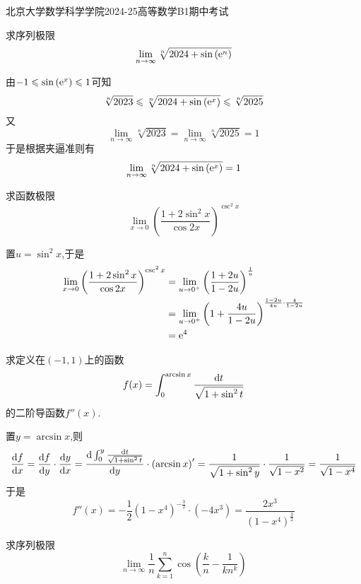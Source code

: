 \documentclass{ctexart}
\begin{document}
\pagestyle{empty}
\begin{center}\Large
    北京大学数学科学学院2024-25高等数学B1期中考试
\end{center}
\begin{problem}[1.(10\songti{分})]
    求序列极限$$\lim_{n\to\infty}{\sqrt[n]{2024+\sin\left(\mathrm{e}^n\right)}}$$
\end{problem}
\begin{solution}[Solution.]
    由$-1\leqslant\sin\left(\mathrm{e}^x\right)\leqslant 1$可知
    $$\sqrt[n]{2023}\leqslant\sqrt[n]{2024+\sin\left(\mathrm{e}^x\right)}\leqslant\sqrt[n]{2025}$$
    又$$\lim_{n\to\infty}\sqrt[n]{2023}=\lim_{n\to\infty}\sqrt[n]{2025}=1$$
    于是根据夹逼准则有$$\lim_{n\to\infty}\sqrt[n]{2024+\sin\left(\mathrm{e}^x\right)}=1$$
\end{solution}
\begin{problem}[2.(10\songti{分})]
    求函数极限$$\lim_{x\to0}\left(\dfrac{1+2\sin^2x}{\cos2x}\right)^{\csc^2x}$$
\end{problem}
\begin{solution}[Solution.]
    置$u=\sin^2 x$,于是
    $$\begin{aligned}
        \lim_{x\to0}\left(\dfrac{1+2\sin^2x}{\cos2x}\right)^{\csc^2x}
        &= \lim_{u\to0^+}\left(\dfrac{1+2u}{1-2u}\right)^{\frac{1}{u}} \\
        &= \lim_{u\to0^+}\left(1+\dfrac{4u}{1-2u}\right)^{\frac{1-2u}{4u}\cdot\frac{4}{1-2u}} \\
        &= \mathrm{e}^4 
    \end{aligned}$$
\end{solution}
\begin{problem}[3.(10\songti{分})]
    求定义在$(-1,1)$上的函数$$f(x)=\int_0^{\arcsin x}\dfrac{\mathrm{d} t}{\sqrt{1+\sin^2t}}$$的二阶导函数$f''(x)$.
\end{problem}
\begin{solution}[Solution.]
    置$y=\arcsin{x}$,则
    $$\dfrac{\mathrm{d} f}{\mathrm{d} x}=\dfrac{\mathrm{d} f}{\mathrm{d} y}\cdot\dfrac{\mathrm{d} y}{\mathrm{d} x}
    =\dfrac{\mathrm{d}\int_{0}^{y}{\frac{\mathrm{d} t}{\sqrt{1+\sin^2t}}}}{\mathrm{d} y}\cdot\left(\arcsin x\right)'
    =\dfrac{1}{\sqrt{1+\sin^2y}}\cdot\dfrac{1}{\sqrt{1-x^2}}=\dfrac{1}{\sqrt{1-x^4}}$$
    于是$$f''(x)=-\dfrac{1}{2}\left(1-x^4\right)^{-\frac{3}{2}}\cdot(-4x^3)=\dfrac{2x^3}{\left(1-x^4\right)^{\frac{3}{2}}}$$
\end{solution}
\begin{problem}[4.(10\songti{分})]
    求序列极限$$\lim_{n\to\infty}\dfrac{1}{n}\sum_{k=1}^{n}\cos\left(\dfrac{k}{n}-\dfrac{1}{kn^k}\right)$$
\end{problem}
\end{document}
